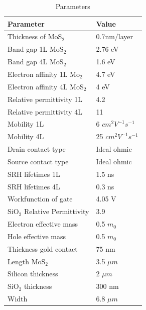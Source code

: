 \documentclass[12pt,a4paper,titlepage]{article}
\begin{document}
\begin{table}[H]
	\centering
	\begin{tabular}{l l}
		\toprule
		\textbf{Parameter}	       & \textbf{Value}			 \\
		\midrule
		Thickness of MoS$_2$       & 0.7nm/layer              \\
		Band gap 1L MoS$_2$        & 2.76 eV                  \\
		Band gap 4L MoS$_2$        & 1.6 eV                   \\
		Electron affinity 1L Mo$_2$& 4.7 eV                   \\
		Electron affinity 4L MoS$_2$& 4 eV                    \\
		Relative permittivity 1L   & 4.2                      \\
		Relative permittivity 4L   & 11                       \\
		Mobility 1L                & 6 $cm^2 V^{-1} s^{-1}$	  \\
		Mobility 4L                & 25 $cm^2 V^{-1} s^{-1}$  \\
		Drain contact type         & Ideal ohmic              \\
		Source contact type        & Ideal ohmic              \\
		SRH lifetimes 1L           & 1.5 ns                   \\
		SRH lifetimes 4L           & 0.3 ns                   \\
		Workfunction of gate       & 4.05 V                   \\
		SiO$_2$ Relative Permittivity & 3.9                   \\
		Electron effective mass    & 0.5 $m_0$            	  \\
		Hole effective mass        & 0.5 $m_0$           	  \\
		Thickness gold contact     & 75 nm                    \\
		Length MoS$_2$             & 3.5 $\mu m$              \\
		Silicon thickness          & 2 $\mu m$                \\
		SiO$_2$ thickness          & 300 nm	                  \\
		Width                      & 6.8 $\mu m$              \\
		\bottomrule
	\end{tabular}
	\caption{Parameters}
	\label{table:MoS2}
\end{table}
\end{document}
